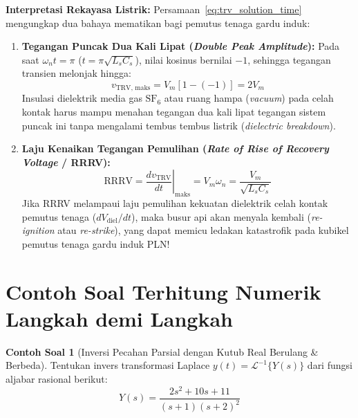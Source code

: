 \documentclass[11pt,a4paper]{article}
\theoremstyle{definition}
\newtheorem{example}{Contoh Soal}[section]
\begin{document}
\textbf{Interpretasi Rekayasa Listrik:}
Persamaan~\eqref{eq:trv_solution_time} mengungkap dua bahaya mematikan bagi pemutus tenaga gardu induk:
\begin{enumerate}[leftmargin=*]
    \item \textbf{Tegangan Puncak Dua Kali Lipat (\textit{Double Peak Amplitude}):} Pada saat $\omega_n t = \pi$ ($t = \pi \sqrt{L_s C_s}$), nilai kosinus bernilai $-1$, sehingga tegangan transien melonjak hingga:
    \begin{equation}
        v_{\text{TRV, maks}} = V_m [1 - (-1)] = 2 V_m
    \end{equation}
    Insulasi dielektrik media gas $\text{SF}_6$ atau ruang hampa (\textit{vacuum}) pada celah kontak harus mampu menahan tegangan dua kali lipat tegangan sistem puncak ini tanpa mengalami tembus tembus listrik (\textit{dielectric breakdown}).
    \item \textbf{Laju Kenaikan Tegangan Pemulihan (\textit{Rate of Rise of Recovery Voltage} / RRRV):}
    \begin{equation}
        \text{RRRV} = \left. \frac{dv_{\text{TRV}}}{dt} \right|_{\text{maks}} = V_m \omega_n = \frac{V_m}{\sqrt{L_s C_s}}
    \end{equation}
    Jika RRRV melampaui laju pemulihan kekuatan dielektrik celah kontak pemutus tenaga ($dV_{\text{diel}}/dt$), maka busur api akan menyala kembali (\textit{re-ignition} atau \textit{re-strike}), yang dapat memicu ledakan katastrofik pada kubikel pemutus tenaga gardu induk PLN!
\end{enumerate}

\section{Contoh Soal Terhitung Numerik Langkah demi Langkah}

\begin{example}[Inversi Pecahan Parsial dengan Kutub Real Berulang \& Berbeda]
Tentukan invers transformasi Laplace $y(t) = \mathcal{L}^{-1}\{Y(s)\}$ dari fungsi aljabar rasional berikut:
\begin{equation*}
    Y(s) = \frac{2s^2 + 10s + 11}{(s + 1)(s + 2)^2}
\end{equation*}
\end{example}
\end{document}
